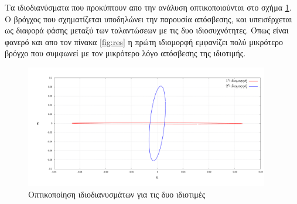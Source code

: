 Τα ιδιοδιανύσματα που προκύπτουν απο την ανάλυση οπτικοποιούνται στο σχήμα \ref{fig:eigenvectors}. Ο βρόγχος που σχηματίζεται υποδηλώνει την παρουσία απόσβεσης, και υπεισέρχεται ως διαφορά φάσης μεταξύ των ταλαντώσεων με τις δυο ιδιοσυχνότητες. Όπως είναι φανερό και απο τον πίνακα \ref{fig:res} η πρώτη ιδιομορφή εμφανίζει πολύ μικρότερο βρόγχο που συμφωνεί με τον μικρότερο λόγο απόσβεσης της ιδιοτιμής.

\begin{figure}[ht!]
    \begin{center}
        \includegraphics[width=0.95\textwidth]{./figures/eigenvectors.pdf}
    \end{center}
    \caption{Οπτικοποίηση ιδιοδιανυσμάτων για τις δυο ιδιοτιμές}
    \label{fig:eigenvectors}
\end{figure}
